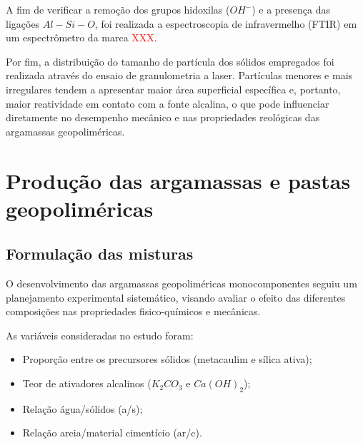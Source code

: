 A fim de verificar a remoção dos grupos hidoxilas ($OH^-$) e a presença das ligações $Al-Si-O$, foi realizada a espectroscopia de infravermelho (FTIR) em um espectrômetro da marca \textcolor{red}{XXX}.

Por fim, a distribuição do tamanho de partícula dos sólidos empregados foi realizada através do ensaio de granulometria a laser. Partículas menores e mais irregulares tendem a apresentar maior área superficial específica e, portanto, maior reatividade em contato com a fonte alcalina, o que pode influenciar diretamente no desempenho mecânico e nas propriedades reológicas das argamassas geopoliméricas.


\section{Produção das argamassas e pastas geopoliméricas}
\label{sec:producao_das_argamassas_e_pastas_geopolimericas}

\subsection{Formulação das misturas}
\label{subsec:formulacao_das_misturas}

O desenvolvimento das argamassas geopoliméricas monocomponentes seguiu um planejamento experimental sistemático, visando avaliar o efeito das diferentes composições nas propriedades fisico-químicos e mecânicas.

As variáveis consideradas no estudo foram:

\begin{itemize}
    \item Proporção entre os precursores sólidos (metacaulim e sílica ativa);
    \item Teor de ativadores alcalinos ($K_2CO_3$ e $Ca(OH)_2$);
    \item Relação água/sólidos (a/s);
    \item Relação areia/material cimentício (ar/c).
\end{itemize}

